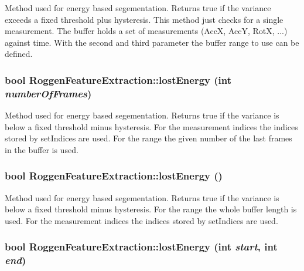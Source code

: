 Method used for energy based segementation. Returns true if the variance exceeds a fixed threshold plus hysteresis. This method just checks for a single measurement. The buffer holds a set of measurements (AccX, AccY, RotX, ...) against time. With the second and third parameter the buffer range to use can be defined. \hypertarget{classRoggenFeatureExtraction_aba7984acb4d1c5ef2d63917a45751ca1}{
\subsubsection[{lostEnergy}]{\setlength{\rightskip}{0pt plus 5cm}bool RoggenFeatureExtraction::lostEnergy (int {\em numberOfFrames})}}
\label{classRoggenFeatureExtraction_aba7984acb4d1c5ef2d63917a45751ca1}
Method used for energy based segementation. Returns true if the variance is below a fixed threshold minus hysteresis. For the measurement indices the indices stored by setIndices are used. For the range the given number of the last frames in the buffer is used. \hypertarget{classRoggenFeatureExtraction_a4d65f5dc285a949f38a92befc663f45b}{
\subsubsection[{lostEnergy}]{\setlength{\rightskip}{0pt plus 5cm}bool RoggenFeatureExtraction::lostEnergy ()}}
\label{classRoggenFeatureExtraction_a4d65f5dc285a949f38a92befc663f45b}
Method used for energy based segementation. Returns true if the variance is below a fixed threshold minus hysteresis. For the range the whole buffer length is used. For the measurement indices the indices stored by setIndices are used. \hypertarget{classRoggenFeatureExtraction_a37b1853c92fdd4c10e0dd7fc35770eda}{
\subsubsection[{lostEnergy}]{\setlength{\rightskip}{0pt plus 5cm}bool RoggenFeatureExtraction::lostEnergy (int {\em start}, \/  int {\em end})}}
\label{classRoggenFeatureExtraction_a37b1853c92fdd4c10e0dd7fc35770eda}
